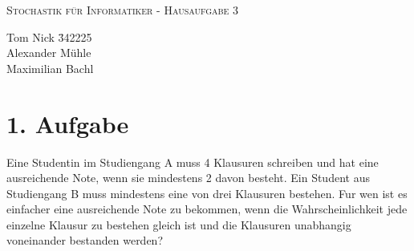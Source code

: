 \documentclass[10pt,a4paper,parskip=half]{scrartcl}
\begin{document}
\begin{center}
\textsc{\Large{Stochastik für Informatiker - Hausaufgabe 3}} \\
\end{center}
\begin{tabbing}
Tom Nick \hspace{1.4cm}\= 342225\\
Alexander Mühle\\
Maximilian Bachl
\end{tabbing}
\section*{1. Aufgabe}
Eine Studentin im Studiengang A muss 4 Klausuren schreiben und hat eine ausreichende
Note, wenn sie mindestens 2 davon besteht. Ein Student aus Studiengang B muss mindestens eine von drei Klausuren bestehen. Fur wen ist es einfacher eine ausreichende Note zu bekommen, wenn die Wahrscheinlichkeit jede einzelne Klausur zu bestehen gleich ist und die Klausuren unabhangig voneinander bestanden werden?
\end{document}
